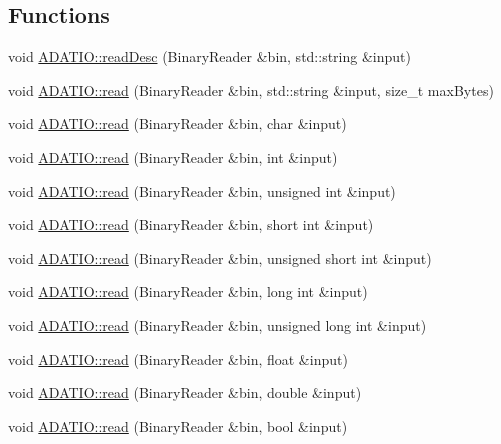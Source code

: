 \subsection*{Functions}
\begin{DoxyCompactItemize}
\item 
void \mbox{\hyperlink{namespaceADATIO_af57306a140489d28cd8fa1107d585906}{A\+D\+A\+T\+I\+O\+::read\+Desc}} (Binary\+Reader \&bin, std\+::string \&input)
\item 
void \mbox{\hyperlink{namespaceADATIO_ab1b78a1922de3cc047517ead7aa99825}{A\+D\+A\+T\+I\+O\+::read}} (Binary\+Reader \&bin, std\+::string \&input, size\+\_\+t max\+Bytes)
\item 
void \mbox{\hyperlink{namespaceADATIO_a32f382a05f4fc1a3d423363f7964ae1f}{A\+D\+A\+T\+I\+O\+::read}} (Binary\+Reader \&bin, char \&input)
\item 
void \mbox{\hyperlink{namespaceADATIO_ad09ed9f17d6e412ab867031ad3b9e117}{A\+D\+A\+T\+I\+O\+::read}} (Binary\+Reader \&bin, int \&input)
\item 
void \mbox{\hyperlink{namespaceADATIO_ab12f044844bc44c732b1d6f903fb16ad}{A\+D\+A\+T\+I\+O\+::read}} (Binary\+Reader \&bin, unsigned int \&input)
\item 
void \mbox{\hyperlink{namespaceADATIO_a84cdbbeb07150af08ce2313df0237728}{A\+D\+A\+T\+I\+O\+::read}} (Binary\+Reader \&bin, short int \&input)
\item 
void \mbox{\hyperlink{namespaceADATIO_a59ee5c8cc7ec8551d39dc0b947a780a5}{A\+D\+A\+T\+I\+O\+::read}} (Binary\+Reader \&bin, unsigned short int \&input)
\item 
void \mbox{\hyperlink{namespaceADATIO_a68d168b17cfa4dee83df2c6039d569ca}{A\+D\+A\+T\+I\+O\+::read}} (Binary\+Reader \&bin, long int \&input)
\item 
void \mbox{\hyperlink{namespaceADATIO_a02ebdefcf436220fd6967af8391de2d6}{A\+D\+A\+T\+I\+O\+::read}} (Binary\+Reader \&bin, unsigned long int \&input)
\item 
void \mbox{\hyperlink{namespaceADATIO_a66f06451ef1705309458a4e2adc71a28}{A\+D\+A\+T\+I\+O\+::read}} (Binary\+Reader \&bin, float \&input)
\item 
void \mbox{\hyperlink{namespaceADATIO_a285f2a260e51c5e11c51e339779378a3}{A\+D\+A\+T\+I\+O\+::read}} (Binary\+Reader \&bin, double \&input)
\item 
void \mbox{\hyperlink{namespaceADATIO_a5f367e2dbd4baac46c87c566b42ce4ce}{A\+D\+A\+T\+I\+O\+::read}} (Binary\+Reader \&bin, bool \&input)
\item 

\end{DoxyCompactItemize}
